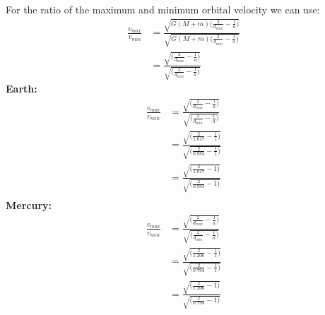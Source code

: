 For the ratio of the maximum and minimum orbital velocity we can use:
\begin{equation*}
    \begin{split}
        \frac{v_{max}}{v_{min}} &= \frac{\sqrt{G (M + m) \biggl(\frac{2}{d_{max}} - \frac{1}{a}\biggr)}}{\sqrt{G (M + m) \biggl(\frac{2}{d_{min}} - \frac{1}{a}\biggr)}}\\
                                &= \frac{\sqrt{\biggl(\frac{2}{d_{max}} - \frac{1}{a}\biggr)}}{\sqrt{\biggl(\frac{2}{d_{min}} - \frac{1}{a}\biggr)}}
    \end{split}
\end{equation*}
\textbf{Earth:}
\begin{equation*}
    \begin{split}
        \frac{v_{max}}{v_{min}} &= \frac{\sqrt{\biggl(\frac{2}{d_{max}} - \frac{1}{a}\biggr)}}{\sqrt{\biggl(\frac{2}{d_{min}} - \frac{1}{a}\biggr)}}\\
                                &= \frac{\sqrt{\biggl(\frac{2}{1.017} - \frac{1}{1}\biggr)}}{\sqrt{\biggl(\frac{2}{0.983} - \frac{1}{1}\biggr)}}\\
                                &= \frac{\sqrt{\biggl(\frac{2}{1.017} - 1\biggr)}}{\sqrt{\biggl(\frac{2}{0.983} - 1\biggr)}}\\
    \end{split}
\end{equation*}
\textbf{Mercury:}
\begin{equation*}
    \begin{split}
        \frac{v_{max}}{v_{min}} &= \frac{\sqrt{\biggl(\frac{2}{d_{max}} - \frac{1}{a}\biggr)}}{\sqrt{\biggl(\frac{2}{d_{min}} - \frac{1}{a}\biggr)}}\\
                                &= \frac{\sqrt{\biggl(\frac{2}{1.206} - \frac{1}{1}\biggr)}}{\sqrt{\biggl(\frac{2}{0.794} - \frac{1}{1}\biggr)}}\\
                                &= \frac{\sqrt{\biggl(\frac{2}{1.206} - 1\biggr)}}{\sqrt{\biggl(\frac{2}{0.794} - 1\biggr)}}\\
    \end{split}
\end{equation*}
